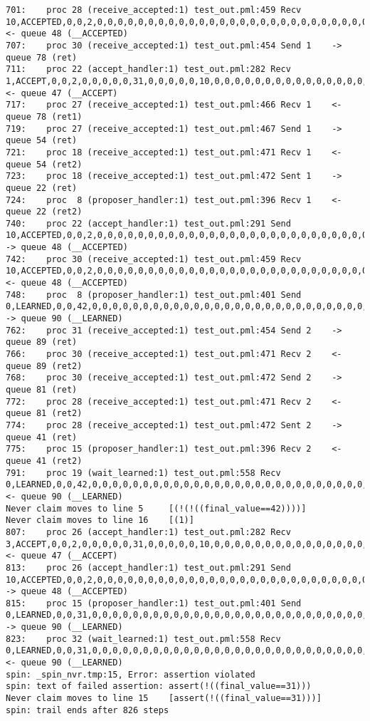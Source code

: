 \begin{lstlisting}[xleftmargin=.01\linewidth, xrightmargin=0.01\linewidth, caption={Message passing caused by the proposer's protocol bug.}, label={lst:paxos_bug}]
701:    proc 28 (receive_accepted:1) test_out.pml:459 Recv 10,ACCEPTED,0,0,2,0,0,0,0,0,0,0,0,0,0,0,0,0,0,0,0,0,0,0,0,0,0,0,0,0,0,0,0,0,0,0,0,0  <- queue 48 (__ACCEPTED)
707:    proc 30 (receive_accepted:1) test_out.pml:454 Send 1    -> queue 78 (ret)
711:    proc 22 (accept_handler:1) test_out.pml:282 Recv 1,ACCEPT,0,0,2,0,0,0,0,0,31,0,0,0,0,0,10,0,0,0,0,0,0,0,0,0,0,0,0,0,0,0,0,0,0,0,0,0     <- queue 47 (__ACCEPT)
717:    proc 27 (receive_accepted:1) test_out.pml:466 Recv 1    <- queue 78 (ret1)
719:    proc 27 (receive_accepted:1) test_out.pml:467 Send 1    -> queue 54 (ret)
721:    proc 18 (receive_accepted:1) test_out.pml:471 Recv 1    <- queue 54 (ret2)
723:    proc 18 (receive_accepted:1) test_out.pml:472 Sent 1    -> queue 22 (ret)
724:    proc  8 (proposer_handler:1) test_out.pml:396 Recv 1    <- queue 22 (ret2)
740:    proc 22 (accept_handler:1) test_out.pml:291 Send 10,ACCEPTED,0,0,2,0,0,0,0,0,0,0,0,0,0,0,0,0,0,0,0,0,0,0,0,0,0,0,0,0,0,0,0,0,0,0,0,0    -> queue 48 (__ACCEPTED)
742:    proc 30 (receive_accepted:1) test_out.pml:459 Recv 10,ACCEPTED,0,0,2,0,0,0,0,0,0,0,0,0,0,0,0,0,0,0,0,0,0,0,0,0,0,0,0,0,0,0,0,0,0,0,0,0  <- queue 48 (__ACCEPTED)
748:    proc  8 (proposer_handler:1) test_out.pml:401 Send 0,LEARNED,0,0,42,0,0,0,0,0,0,0,0,0,0,0,0,0,0,0,0,0,0,0,0,0,0,0,0,0,0,0,0,0,0,0,0,0   -> queue 90 (__LEARNED)
762:    proc 31 (receive_accepted:1) test_out.pml:454 Send 2    -> queue 89 (ret)
766:    proc 30 (receive_accepted:1) test_out.pml:471 Recv 2    <- queue 89 (ret2)
768:    proc 30 (receive_accepted:1) test_out.pml:472 Send 2    -> queue 81 (ret)
772:    proc 28 (receive_accepted:1) test_out.pml:471 Recv 2    <- queue 81 (ret2)
774:    proc 28 (receive_accepted:1) test_out.pml:472 Sent 2    -> queue 41 (ret)
775:    proc 15 (proposer_handler:1) test_out.pml:396 Recv 2    <- queue 41 (ret2)
791:    proc 19 (wait_learned:1) test_out.pml:558 Recv 0,LEARNED,0,0,42,0,0,0,0,0,0,0,0,0,0,0,0,0,0,0,0,0,0,0,0,0,0,0,0,0,0,0,0,0,0,0,0,0       <- queue 90 (__LEARNED)
Never claim moves to line 5     [(!(!((final_value==42))))]
Never claim moves to line 16    [(1)]
807:    proc 26 (accept_handler:1) test_out.pml:282 Recv 3,ACCEPT,0,0,2,0,0,0,0,0,31,0,0,0,0,0,10,0,0,0,0,0,0,0,0,0,0,0,0,0,0,0,0,0,0,0,0,0     <- queue 47 (__ACCEPT)
813:    proc 26 (accept_handler:1) test_out.pml:291 Send 10,ACCEPTED,0,0,2,0,0,0,0,0,0,0,0,0,0,0,0,0,0,0,0,0,0,0,0,0,0,0,0,0,0,0,0,0,0,0,0,0    -> queue 48 (__ACCEPTED)
815:    proc 15 (proposer_handler:1) test_out.pml:401 Send 0,LEARNED,0,0,31,0,0,0,0,0,0,0,0,0,0,0,0,0,0,0,0,0,0,0,0,0,0,0,0,0,0,0,0,0,0,0,0,0   -> queue 90 (__LEARNED)
823:    proc 32 (wait_learned:1) test_out.pml:558 Recv 0,LEARNED,0,0,31,0,0,0,0,0,0,0,0,0,0,0,0,0,0,0,0,0,0,0,0,0,0,0,0,0,0,0,0,0,0,0,0,0       <- queue 90 (__LEARNED)
spin: _spin_nvr.tmp:15, Error: assertion violated
spin: text of failed assertion: assert(!((final_value==31)))
Never claim moves to line 15    [assert(!((final_value==31)))]
spin: trail ends after 826 steps
\end{lstlisting}

